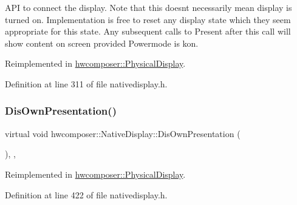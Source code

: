A\+PI to connect the display. Note that this doesn\textquotesingle{}t necessarily mean display is turned on. Implementation is free to reset any display state which they seem appropriate for this state. Any subsequent calls to Present after this call will show content on screen provided Powermode is kon. 

Reimplemented in \mbox{\hyperlink{classhwcomposer_1_1PhysicalDisplay_a83777a9b17a33aa45295c7c354e802b2}{hwcomposer\+::\+Physical\+Display}}.



Definition at line 311 of file nativedisplay.\+h.


\begin{DoxyCode}{0}
\end{DoxyCode}
\mbox{\label{classhwcomposer_1_1NativeDisplay_ac7d72bf8971e3b84068b9bd59099c854}} 
\subsubsection{\texorpdfstring{Dis\+Own\+Presentation()}{DisOwnPresentation()}}
{\footnotesize\ttfamily virtual void hwcomposer\+::\+Native\+Display\+::\+Dis\+Own\+Presentation (\begin{DoxyParamCaption}\item[{\mbox{\hyperlink{classhwcomposer_1_1NativeDisplay}{Native\+Display}} $\ast$}]{ }\end{DoxyParamCaption})\hspace{0.3cm}{\ttfamily [inline]}, {\ttfamily [protected]}, {\ttfamily [virtual]}}



Reimplemented in \mbox{\hyperlink{classhwcomposer_1_1PhysicalDisplay_aba785358d36ee129092a1a9ec66f3ff4}{hwcomposer\+::\+Physical\+Display}}.



Definition at line 422 of file nativedisplay.\+h.


\begin{DoxyCode}{0}
\end{DoxyCode}
\mbox{\label{classhwcomposer_1_1NativeDisplay_a9d4d9d2f6633fe37025210cac6e8cc6c}} 
